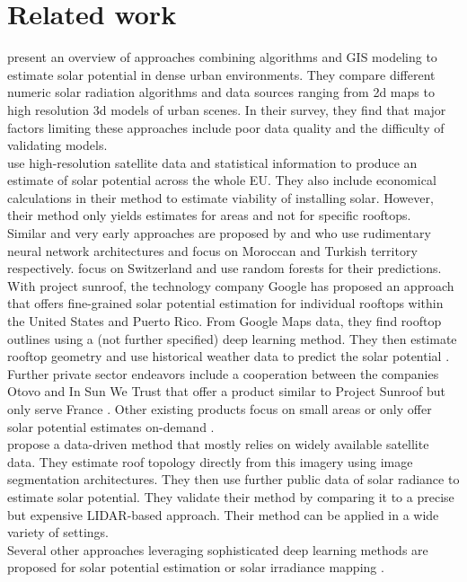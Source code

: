\documentclass{article} %
\begin{document}
\section*{Related work}
\citet{freitas2015modelling} present an overview of approaches combining algorithms and GIS modeling to estimate solar potential in dense urban environments. They compare different numeric solar radiation algorithms and data sources ranging from 2d maps to high resolution 3d models of urban scenes. In their survey, they find that major factors limiting these approaches include poor data quality and the difficulty of validating models.\\
\cite{bodis2019high} use high-resolution satellite data and statistical information to produce an estimate of solar potential across the whole EU. They also include economical calculations in their method to estimate viability of installing solar. However, their method only yields estimates for areas and not for specific rooftops.\\
Similar and very early approaches are proposed by \citet{ouammi2012artificial} and \citet{sozen2004use} who use rudimentary neural network architectures and focus on Moroccan and Turkish territory respectively. \citet{assouline2018large} focus on Switzerland and use random forests for their predictions.\\
With project sunroof, the technology company Google has proposed an approach that offers fine-grained solar potential estimation for individual rooftops within the United States and Puerto Rico. From Google Maps data, they find rooftop outlines using a (not further specified) deep learning method. They then estimate rooftop geometry and use historical weather data to predict the solar potential \cite{sunroof}.\\
Further private sector endeavors include a cooperation between the companies Otovo and In Sun We Trust that offer a product similar to Project Sunroof but only serve France \cite{insun}. Other existing products focus on small areas or only offer solar potential estimates on-demand \cite{insun, rhino}.\\
\citet{lee2019deeproof} propose a data-driven method that mostly relies on widely available satellite data. They estimate roof topology directly from this imagery using image segmentation architectures. They then use further public data of solar radiance to estimate solar potential. They validate their method by comparing it to a precise but expensive LIDAR-based approach. Their method can be applied in a wide variety of settings.\\
Several other approaches leveraging sophisticated deep learning methods are proposed for solar potential estimation \cite{huang2019urban, zhong2021city} or solar irradiance mapping \cite{kumari2021deep, chandola2020multi, bamisile2020application}.
\end{document}
